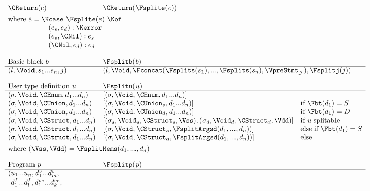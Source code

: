 \begin{docpart}
\begin{figure}[htbp]
\begin{center}
\[\begin{array}{lll}
      \CReturn(e)  & \CReturn(\Fsplite(e)) \\[1ex]
      \mc{3}{l}{\textnormal{where } \tilde{e} = 
        \begin{array}[t]{@{}l@{}}
          \Kcase\ \Fsplite(e)\ \Kof \\
          \quad (e_s, e_d)   : \Kerror \\
          \quad (e_s, \CNil) : e_s \\
          \quad (\CNil, e_d) : e_d \\
        \end{array}}\\
      \\
      \textnormal{Basic block } b & \Fsplitb(b) \\\hline
      (l, \Void,s_1...s_n,j) &
      \mc{2}{l}{
        (l, \Void, \Fconcat(\Fsplits(s_1), ..., \Fsplits(s_n),
        \VpreStmt_{\mathcal{J}}),
        \Fsplitj(j))}
      \\[1em]
      \textnormal{User type definition } u & \Fsplitu(u) \\\hline
       (\sigma, \Void, \CEnum, d_1...d_n)  &
      [(\sigma, \Void, \CEnum, d_1...d_n)] \\
       (\sigma, \Void, \CUnion, d_1...d_n)  & 
      [(\sigma, \Void, \CUnion_s, d_1...d_n)]
      & \textnormal{if }\Fbt(d_1) = S \\
       (\sigma, \Void, \CUnion, d_1...d_n)  & 
      [(\sigma, \Void, \CUnion_d, d_1...d_n)]
      & \textnormal{if }\Fbt(d_1) = D \\
       (\sigma, \Void, \CStruct, d_1...d_n) &
      [(\sigma_s, \Void_s, \CStruct_s, \Vss),
       (\sigma_d, \Void_d, \CStruct_d, \Vdd)] 
      & \textnormal{if $u$ splitable} \\ 
       (\sigma, \Void, \CStruct, d_1...d_n) &
      [(\sigma, \Void, \CStruct_s, \FsplitArgsd(d_1, ..., d_n))] & 
      \textnormal{else if } \Fbt(d_1) = S \\ 
       (\sigma, \Void, \CStruct, d_1...d_n) &
      [(\sigma, \Void, \CStruct_d, \FsplitArgsd(d_1, ..., d_n))] & 
      \textnormal{else} \\[1ex]
      \mc{3}{l}{\textnormal{where } 
        (\Vss,\Vdd) = \FsplitMems(d_1, ..., d_n)}
      \\[1em]
      \textnormal{Program } p & \Fsplitp(p) \\\hline
      (
      \begin{array}[t]{@{}l@{}}
        u_1 ... u_n, d^v_1 ... d^v_m, \\
        d^f_1 ... d^f_l, d^{ve}_1 ... d^{ve}_k, \\

\end{array}
\end{array}\]
\end{center}
\end{figure}
\end{docpart}
